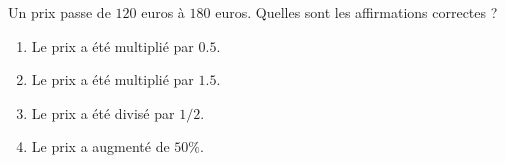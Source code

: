 
\begin{exercice}\label{exoPremiere-0010}

    Un prix passe de \( 120\) euros à \( 180\) euros. Quelles sont les affirmations correctes ?
    \begin{multicols}{2}
    \begin{enumerate}
        \item
            Le prix a été multiplié par \( 0.5\).
        \item
            Le prix a été multiplié par \( 1.5\).
        \item
            Le prix a été divisé par \( 1/2\).
        \item
            Le prix a augmenté de \( 50\%\).
    \end{enumerate}
    \end{multicols}

\end{exercice}
